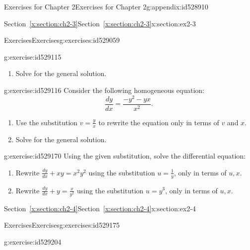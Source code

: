 \documentclass[oneside,10pt,]{book}
\newcommand{\xreffont}{\relax}
\numberwithin{equation}{section}
\numberwithin{equation}{section}
\begin{document}
\begin{appendixptx}{Exercises for Chapter 2}{}{Exercises for Chapter 2}{}{}{g:appendix:id528910}
\begin{sectionptx}{Section~{\xreffont\ref*{x:section:ch2-3}}}{}{Section~{\xreffont\ref*{x:section:ch2-3}}}{}{}{x:section:ex2-3}
\begin{exercises-subsection-numberless}{Exercises}{}{Exercises}{}{}{g:exercises:id529059}
\begin{divisionexercise}{2}{}{}{g:exercise:id529115}
\begin{enumerate}[label=(\alph*)]
\item{}Solve for the general solution.%
\end{enumerate}
%
\end{divisionexercise}%
\begin{divisionexercise}{3}{}{}{g:exercise:id529116}%
Consider the following homogeneous equation:%
%
\begin{equation*}
\frac{dy}{dx}=\frac{-y^{2}-yx}{x^{2}}.
\end{equation*}
%
\begin{enumerate}[label=(\alph*)]
\item{}Use the substitution \(v=\frac{y}{x}\) to rewrite the equation only in terms of \(v\) and \(x\).%
\item{}Solve for the general solution.%
\end{enumerate}
\end{divisionexercise}%
\begin{divisionexercise}{4}{}{}{g:exercise:id529170}%
Using the given substitution, solve the differential equation:%
%
\begin{enumerate}[label=(\alph*)]
\item{}Rewrite \(\frac{dy}{dx}+xy=x^{2}y^{2}\) using the substitution \(u=\frac{1}{y}\), only in terms of \(u,x\).%
\item{}Rewrite \(\frac{dy}{dx}+y=\frac{x}{y^{2}}\) using the substitution \(u=y^{3}\), only in terms of \(u,x\).%
\end{enumerate}
\end{divisionexercise}%
\end{exercises-subsection-numberless}
\end{sectionptx}
%
%
\typeout{************************************************}
\typeout{Section C.4 Section~{\xreffont\ref*{x:section:ch2-4}}}
\typeout{************************************************}
%
\begin{sectionptx}{Section~{\xreffont\ref*{x:section:ch2-4}}}{}{Section~{\xreffont\ref*{x:section:ch2-4}}}{}{}{x:section:ex2-4}
%
%
\typeout{************************************************}
\typeout{************************************************}
%
\begin{exercises-subsection-numberless}{Exercises}{}{Exercises}{}{}{g:exercises:id529175}
\begin{divisionexercise}{1}{}{}{g:exercise:id529204}%

\end{divisionexercise}
\end{exercises-subsection-numberless}
\end{sectionptx}
\end{appendixptx}
\end{document}
